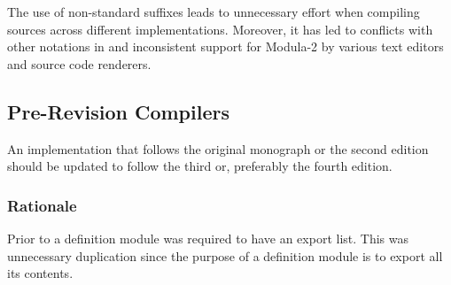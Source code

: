 \documentclass[10pt,a4paper]{article}
\begin{document}
The use of non-standard suffixes leads to unnecessary effort when compiling
sources across different implementations. Moreover, it has led to conflicts
with other notations in and inconsistent support for Modula-2 by various text
editors and source code renderers.


\subsection{Pre-Revision Compilers}
An implementation that follows the original monograph \cite{Wirth78} or the
second edition \cite{Wirth83} should be updated to follow the third
\cite{Wirth85} or, preferably the fourth \cite{Wirth88} edition.

\subsubsection{Rationale}
Prior to \cite{Wirth85} a definition module was required to have an export
list. This was unnecessary duplication since the purpose of a definition
module is to export all its contents. 


\newpage

\printglossary[title=Definitions, toctitle=Definitions]




\end{document}
